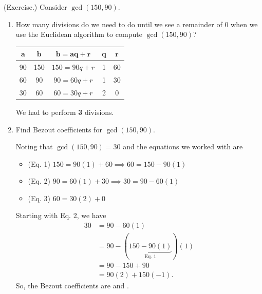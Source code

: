 \documentclass[letterpaper]{article}
\newcommand{\0}{\mathbf{0}}
\begin{document}
\begin{mdframed}
    (Exercise.) Consider $\gcd(150, 90)$.
    
    \begin{enumerate}
        \item How many divisions do we need to do until we see a remainder of 0 when we use the Euclidean algorithm to compute $\gcd(150, 90)$?
        \begin{mdframed}
            \begin{center}
                \begin{tabular}{|c|c|c|c|c|}
                    \hline 
                    $\mathbf{a}$ & $\mathbf{b}$ & $\mathbf{b = aq + r}$ & $\mathbf{q}$ & $\mathbf{r}$ \\ 
                    \hline 
                    90 & 150 & $150 = 90q + r$ & 1 & 60 \\ 
                    60 & 90 & $90 = 60q + r$ & 1 & 30 \\ 
                    30 & 60 & $60 = 30q + r$ & 2 & 0 \\ 
                    \hline 
                \end{tabular}
            \end{center}
            We had to perform \textbf{3} divisions. 
        \end{mdframed}

        \item Find Bezout coefficients for $\gcd(150, 90)$. 
        \begin{mdframed}
            Noting that $\gcd(150, 90) = 30$ and the equations we worked with are 
            \begin{itemize}
                \item (Eq. 1) $150 = 90(1) + 60 \implies 60 = 150 - 90(1)$
                \item (Eq. 2) $90 = 60(1) + 30 \implies 30 = 90 - 60(1)$
                \item (Eq. 3) $60 = 30(2) + 0$
            \end{itemize}
            Starting with Eq. 2, we have 
            \begin{equation*}
                \begin{aligned}
                    30 &= 90 - 60(1) \\ 
                        &= 90 - (\underbrace{150 - 90(1)}_{\text{Eq. 1}})(1) \\ 
                        &= 90 - 150 + 90 \\ 
                        &= 90(2) + 150(-1).
                \end{aligned}
            \end{equation*}
            So, the Bezout coefficients are  and .
        \end{mdframed}
    \end{enumerate}
\end{mdframed}
\end{document}
